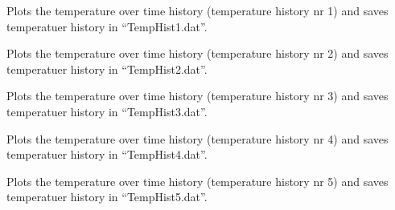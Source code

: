 \documentclass[letterpaper,10pt,english]{sphinxmanual}
\begin{document}
\begin{fulllineitems}
\begin{fulllineitems}
\end{fulllineitems}


\begin{fulllineitems}
\label{GUI:PKPgui.Ui_PKP.Plot1}
Plots the temperature over time history (temperature history nr 1) and saves temperatuer history in ``TempHist1.dat''.

\end{fulllineitems}


\begin{fulllineitems}
\label{GUI:PKPgui.Ui_PKP.Plot2}
Plots the temperature over time history (temperature history nr 2) and saves temperatuer history in ``TempHist2.dat''.

\end{fulllineitems}


\begin{fulllineitems}
\label{GUI:PKPgui.Ui_PKP.Plot3}
Plots the temperature over time history (temperature history nr 3) and saves temperatuer history in ``TempHist3.dat''.

\end{fulllineitems}


\begin{fulllineitems}
\label{GUI:PKPgui.Ui_PKP.Plot4}
Plots the temperature over time history (temperature history nr 4) and saves temperatuer history in ``TempHist4.dat''.

\end{fulllineitems}


\begin{fulllineitems}
\label{GUI:PKPgui.Ui_PKP.Plot5}
Plots the temperature over time history (temperature history nr 5) and saves temperatuer history in ``TempHist5.dat''.

\end{fulllineitems}



\end{fulllineitems}
\end{document}
